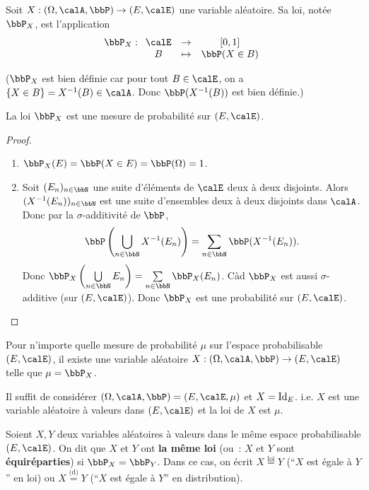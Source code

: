 \begin{deff}
    Soit $X: (\Omega, \calA, \bbP) \to (E, \calE)$ une variable aléatoire.
    Sa loi, notée $\bbP_X$, est l'application
    \[ \bbP_X:
        \begin{array}[t]{ccc}
            \calE & \to & [0, 1]        \\
            B     & \tp & \bbP(X \in B)
        \end{array}
    \]

    ($\bbP_X$ est bien définie car pour tout $B \in \calE$, on a $\{ X \in B \} = X^{-1}(B) \in \calA$.
    Donc $\bbP(X^{-1}(B))$ est bien définie.)
\end{deff}

\begin{thm}
    La loi $\bbP_X$ est une mesure de probabilité sur $(E, \calE)$.
\end{thm}

\begin{proof}
    $\ $
    \begin{enumerate}
        \item $\bbP_X(E) = \bbP(X \in E) = \bbP(\Omega) = 1$.
        \item Soit $(E_n)_{n \in \bbN}$ une suite d'éléments de $\calE$ deux à deux disjoints.
              Alors $(X^{-1}(E_n))_{n \in \bbN}$ est une suite d'ensembles deux à deux disjoints dans $\calA$.
              Donc par la $\sigma$-additivité de $\bbP$,
              \[ \bbP \left(\bigcup\limits_{n \in \bbN} X^{-1}(E_n) \right) = \sum\limits_{n \in \bbN} \bbP(X^{-1}(E_n)). \]
              Donc $\bbP_X \left(\bigcup\limits_{n \in \bbN} E_n\right) = \sum\limits_{n \in \bbN} \bbP_X(E_n)$.
              Càd $\bbP_X$ est aussi $\sigma$-additive (sur $(E, \calE)$).
              Donc $\bbP_X$ est une probabilité sur $(E, \calE)$.
    \end{enumerate}
\end{proof}

\begin{rqq}
    Pour n'importe quelle mesure de probabilité $\mu$ sur l'espace probabilisable $(E, \calE)$,
    il existe une variable aléatoire $X: (\Omega, \calA, \bbP) \to (E, \calE)$ telle que $\mu = \bbP_X$.

    Il suffit de considérer $(\Omega, \calA, \bbP) = (E, \calE, \mu)$ et $X = \operatorname{Id}_E$.
    i.e. $X$ est une variable aléatoire à valeurs dans $(E, \calE)$ et la loi de $X$ est $\mu$.
\end{rqq}

\begin{deff}
    Soient $X, Y$ deux variables aléatoires à valeurs dans le même espace probabilisable $(E, \calE)$.
    On dit que $X$ et $Y$ ont \textbf{la même loi} (ou~: $X$ et $Y$ sont \textbf{équiréparties}) si $\bbP_X = \bbP_Y$.
    Dans ce cas, on écrit $X \overset{\text{loi}}{=} Y$ (``$X$ est égale à $Y$'' en loi) ou
    $X \overset{\text{(d)}}{=} Y$ (``$X$ est égale à $Y$'' en distribution).
\end{deff}

